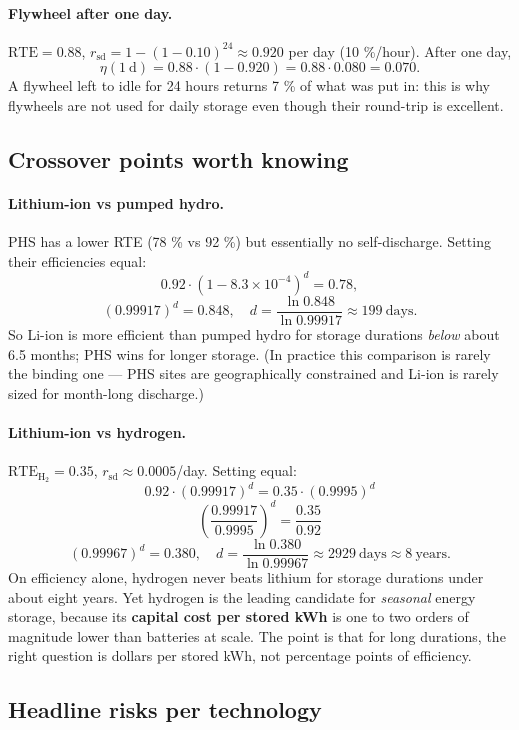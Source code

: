 \paragraph{Flywheel after one day.}
$\mathrm{RTE} = 0.88$, $r_{\mathrm{sd}} = 1 - (1 - 0.10)^{24} \approx 0.920$
per day (10 \%/hour). After one day,
\[
\eta(1\ \text{d}) = 0.88 \cdot (1 - 0.920) = 0.88 \cdot 0.080 = 0.070.
\]
A flywheel left to idle for 24 hours returns 7 \% of what was put in:
this is why flywheels are not used for daily storage even though their
round-trip is excellent.

\subsection*{Crossover points worth knowing}

\paragraph{Lithium-ion vs pumped hydro.}
PHS has a lower RTE (78 \% vs 92 \%) but essentially no
self-discharge. Setting their efficiencies equal:
\[
0.92 \cdot (1 - 8.3\times 10^{-4})^d = 0.78,
\]
\[
(0.99917)^d = 0.848, \quad d = \frac{\ln 0.848}{\ln 0.99917} \approx 199\ \text{days}.
\]
So Li-ion is more efficient than pumped hydro for storage durations
\emph{below} about 6.5 months; PHS wins for longer storage. (In
practice this comparison is rarely the binding one --- PHS sites are
geographically constrained and Li-ion is rarely sized for
month-long discharge.)

\paragraph{Lithium-ion vs hydrogen.}
$\mathrm{RTE}_{\mathrm{H}_2} = 0.35$, $r_{\mathrm{sd}} \approx 0.0005$/day.
Setting equal:
\[
0.92 \cdot (0.99917)^d = 0.35 \cdot (0.9995)^d
\]
\[
\left(\frac{0.99917}{0.9995}\right)^d = \frac{0.35}{0.92}
\]
\[
(0.99967)^d = 0.380, \quad d = \frac{\ln 0.380}{\ln 0.99967} \approx 2929\ \text{days} \approx 8\ \text{years}.
\]
On efficiency alone, hydrogen never beats lithium for storage
durations under about eight years. Yet hydrogen is the leading
candidate for \emph{seasonal} energy storage, because its
\textbf{capital cost per stored kWh} is one to two orders of
magnitude lower than batteries at scale. The point is that for long
durations, the right question is dollars per stored kWh, not
percentage points of efficiency.

\subsection*{Headline risks per technology}

